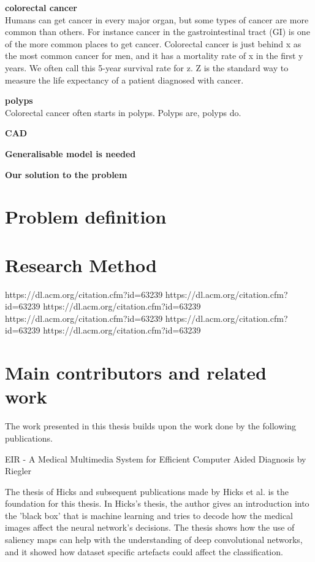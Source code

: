\textbf{colorectal cancer}\\
Humans can get cancer in every major organ, but some types of cancer are more common than others.    
For instance cancer in the gastrointestinal tract (GI) is one of the more common places to get cancer. Colorectal cancer is just behind x as the most common cancer for men, and it has a mortality rate of x in the first y years. %
We often call this 5-year survival rate for z. Z is the standard way to measure the life expectancy of a patient diagnosed with cancer. 
    

\textbf{polyps}\\
Colorectal cancer often starts in polyps. 
Polyps are, polyps do.

\textbf{CAD}

\textbf{Generalisable model is needed}


\textbf{Our solution to the problem}

    
    
\section{Problem definition}
\section{Research Method}
https://dl.acm.org/citation.cfm?id=63239
https://dl.acm.org/citation.cfm?id=63239
https://dl.acm.org/citation.cfm?id=63239
https://dl.acm.org/citation.cfm?id=63239
https://dl.acm.org/citation.cfm?id=63239
https://dl.acm.org/citation.cfm?id=63239

\section{Main contributors and related work}
The work presented in this thesis builds upon the work done by the following publications.


EIR - A Medical Multimedia System for Efficient
Computer Aided Diagnosis by Riegler 

The thesis of Hicks and subsequent publications made by Hicks et al. is the foundation for this thesis. In Hicks's thesis, the author gives an introduction into the 'black box' that is machine learning and tries to decode how the medical images affect the neural network's decisions. 
The thesis shows how the use of saliency maps can help with the understanding of deep convolutional networks, and it showed how dataset specific artefacts could affect the classification.


